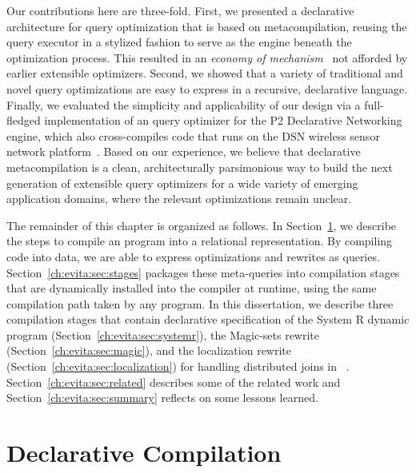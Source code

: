 Our contributions here are three-fold.  First, we presented a declarative architecture for query optimization 
that is based on metacompilation, reusing the query executor in a stylized fashion to serve as the engine beneath 
the optimization process.  This resulted in an {\em economy of mechanism}~\cite{Saltzer75theprotection}
not afforded by earlier extensible optimizers. Second, we showed that a variety of traditional and novel 
query optimizations are easy to express in a recursive, declarative language. Finally, 
we evaluated the simplicity and applicability of our design via a full-fledged implementation 
of an \OVERLOG query optimizer for the P2 Declarative Networking engine, which also 
cross-compiles code that runs on the DSN wireless sensor network platform~\cite{chu-sensys07}.  
Based on our experience, we believe that declarative metacompilation is a clean,
architecturally parsimonious way to build the next generation of extensible query optimizers
for a wide variety of emerging application domains, where the relevant optimizations remain
unclear.

The remainder of this chapter is organized as follows. In Section~\ref{ch:evita:sec:compile}, we describe
the steps to compile an \OVERLOG program into a relational representation. By compiling code into 
data, we are able to express optimizations and rewrites as queries. Section~\ref{ch:evita:sec:stages} 
packages these meta-queries into compilation stages that are dynamically installed into the compiler 
at runtime, using the same compilation path taken by any \OVERLOG program. In this dissertation, we describe 
three compilation stages that contain declarative specification of the System R dynamic program (Section~\ref{ch:evita:sec:systemr}), 
the Magic-sets rewrite (Section~\ref{ch:evita:sec:magic}), and the localization rewrite (Section~\ref{ch:evita:sec:localization})
for handling distributed joins in \OVERLOG~\cite{loo-sigmod06}. Section~\ref{ch:evita:sec:related} describes some
of the related work and Section~\ref{ch:evita:sec:summary} reflects on some lessons learned.

\section{Declarative Compilation}
\label{ch:evita:sec:compile}

